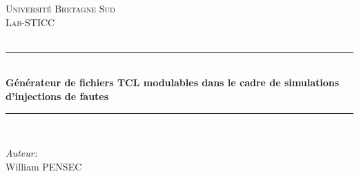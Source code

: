 \begin{titlepage}

    \newcommand{\HRule}{\rule{\linewidth}{0.5mm}} %

    \center %


    \textsc{\LARGE Université Bretagne Sud}\\[1.5cm] %
    \textsc{\Large Lab-STICC}\\[1.5cm] %

    \textsc{\large }\\[1cm] %


    \HRule \\[0.4cm]
    { \huge \bfseries Générateur de fichiers TCL modulables dans le cadre de simulations d'injections de fautes}\\[0.2cm] %
    \HRule \\[2cm]


    \begin{minipage}{0.48\textwidth}
        \begin{center} \Large
            \emph{Auteur:}\\
            William \textsc{PENSEC} %
        \end{center}
    \end{minipage}\\[1cm]



\end{titlepage}
